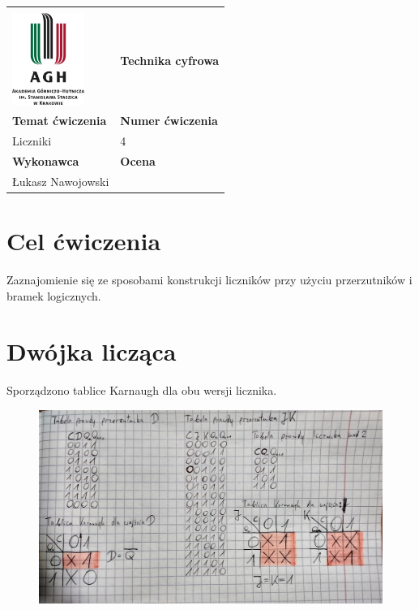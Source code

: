 \documentclass[12pt,a4paper]{article}
\begin{document}
\begin{table}[]
\label{my-label}
\begin{tabular}{|p{7.5cm}|p{7.5cm}|}
\hline
									           					&                           \\
\includegraphics[height=3cm]{logo}             					& \textbf{Technika cyfrowa} \\ \hline
\multicolumn{1}{|l|}{\textbf{Temat ćwiczenia}} 					& \textbf{Numer ćwiczenia}  \\
\multicolumn{1}{|l|}{Liczniki}	& 4                         \\ \hline
\multicolumn{1}{|l|}{\textbf{Wykonawca}}       & \textbf{Ocena}            \\
\multicolumn{1}{|l|}{Łukasz Nawojowski}          &                           \\ \hline
\end{tabular}
\end{table}

\section{Cel ćwiczenia}
Zaznajomienie się ze sposobami konstrukcji liczników przy użyciu przerzutników i bramek logicznych.

\section{Dwójka licząca}
Sporządzono tablice Karnaugh dla obu wersji licznika.
\begin{figure}[H]
\centering
\includegraphics[width=\textwidth]{img/4a_tables}
\end{figure}
\end{document}
